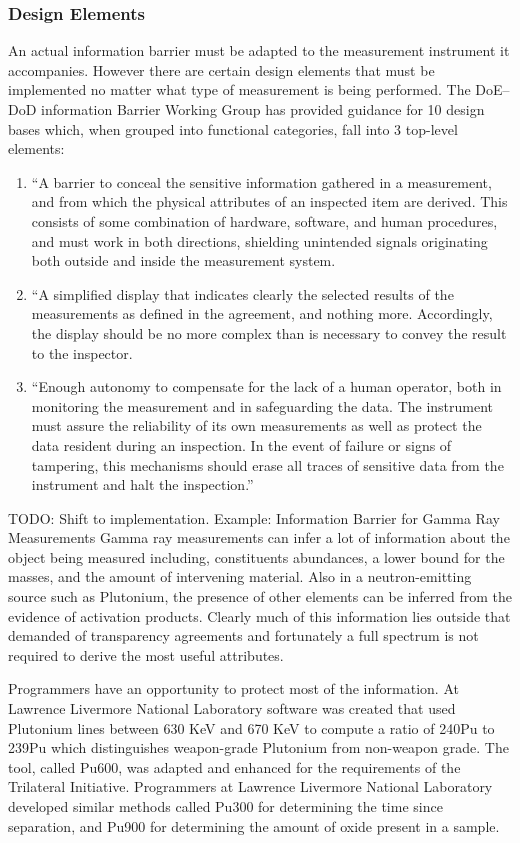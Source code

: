 \documentclass[twoside,titlepage,11pt,twocolumn,a4paper]{article}
\begin{document}
\subsubsection{Design Elements}
An actual information barrier must be adapted to the measurement
instrument it accompanies. However there are certain design elements
that must be implemented no matter what type of measurement is being
performed. The DoE--DoD information Barrier Working Group has provided
guidance for 10 design bases which, when grouped into functional
categories, fall into 3 top-level elements:
\begin{enumerate}
  \item ``A barrier to conceal the sensitive information gathered in a
    measurement, and from which the physical attributes of an
    inspected item are derived. This consists of some combination of
    hardware, software, and human procedures, and must work in both
    directions, shielding unintended signals originating both outside
    and inside the measurement system.
  \item ``A simplified display that indicates clearly the selected
    results of the measurements as defined in the agreement, and
    nothing more. Accordingly, the display should be no more complex
    than is necessary to convey the result to the inspector.
  \item ``Enough autonomy to compensate for the lack of a human
    operator, both in monitoring the measurement and in safeguarding
    the data. The instrument must assure the reliability of its own
    measurements as well as protect the data resident during an
    inspection. In the event of failure or signs of tampering, this
    mechanisms should erase all traces of sensitive data from the
    instrument and halt the inspection.'' \citep{depDoE1999}
\end{enumerate}

TODO: Shift to implementation.
Example: Information
Barrier for Gamma Ray Measurements Gamma ray measurements can infer a
lot of information about the object being measured including,
constituents abundances, a lower bound for the masses, and the amount
of intervening material. Also in a neutron-emitting source such as
Plutonium, the presence of other elements can be inferred from the
evidence of activation products. Clearly much of this information lies
outside that demanded of transparency agreements and fortunately a
full spectrum is not required to derive the most useful attributes.

Programmers have an opportunity to protect most of the information. At
Lawrence Livermore National Laboratory software was created that used
Plutonium lines between 630 KeV and 670 KeV to compute a ratio of
240Pu to 239Pu which distinguishes weapon-grade Plutonium from
non-weapon grade. The tool, called Pu600, was adapted and enhanced for
the requirements of the Trilateral Initiative. Programmers at Lawrence
Livermore National Laboratory developed similar methods called Pu300
for determining the time since separation, and Pu900 for determining
the amount of oxide present in a sample.
\end{document}
